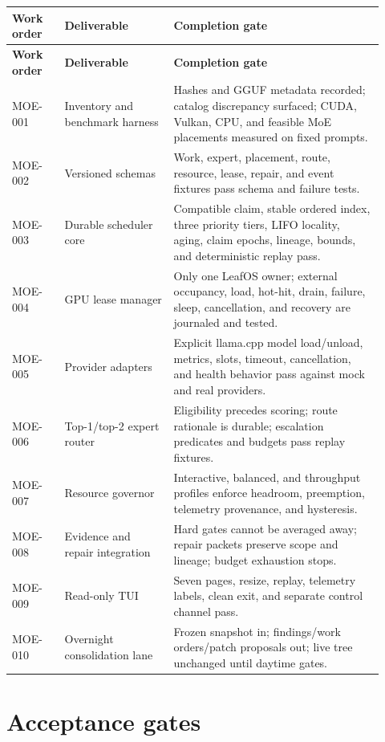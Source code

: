\documentclass[11pt,letterpaper]{article}
\begin{document}
\begin{longtable}{@{}L{0.13\linewidth}L{0.27\linewidth}L{0.52\linewidth}@{}}
\toprule
\textbf{Work order} & \textbf{Deliverable} & \textbf{Completion gate} \\
\midrule
\endfirsthead
\toprule
\textbf{Work order} & \textbf{Deliverable} & \textbf{Completion gate} \\
\midrule
\endhead
MOE-001 &
Inventory and benchmark harness &
Hashes and GGUF metadata recorded; catalog discrepancy surfaced; CUDA, Vulkan,
CPU, and feasible MoE placements measured on fixed prompts. \\
MOE-002 &
Versioned schemas &
Work, expert, placement, route, resource, lease, repair, and event fixtures pass
schema and failure tests. \\
MOE-003 &
Durable scheduler core &
Compatible claim, stable ordered index, three priority tiers, LIFO locality,
aging, claim epochs, lineage, bounds, and deterministic replay pass. \\
MOE-004 &
GPU lease manager &
Only one LeafOS owner; external occupancy, load, hot-hit, drain, failure, sleep,
cancellation, and recovery are journaled and tested. \\
MOE-005 &
Provider adapters &
Explicit llama.cpp model load/unload, metrics, slots, timeout, cancellation,
and health behavior pass against mock and real providers. \\
MOE-006 &
Top-1/top-2 expert router &
Eligibility precedes scoring; route rationale is durable; escalation predicates
and budgets pass replay fixtures. \\
MOE-007 &
Resource governor &
Interactive, balanced, and throughput profiles enforce headroom, preemption,
telemetry provenance, and hysteresis. \\
MOE-008 &
Evidence and repair integration &
Hard gates cannot be averaged away; repair packets preserve scope and lineage;
budget exhaustion stops. \\
MOE-009 &
Read-only TUI &
Seven pages, resize, replay, telemetry labels, clean exit, and separate control
channel pass. \\
MOE-010 &
Overnight consolidation lane &
Frozen snapshot in; findings/work orders/patch proposals out; live tree unchanged
until daytime gates. \\
\bottomrule
\end{longtable}

\section{Acceptance gates}
\end{document}
